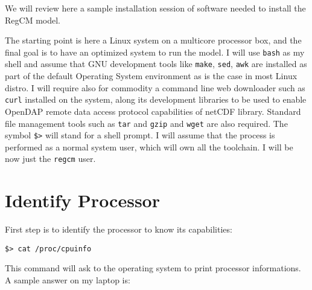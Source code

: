 
We will review here a sample installation session of software needed to
install the RegCM model.

The starting point is here a Linux system on a multicore processor box, and
the final goal is to have an optimized system to run the model.
I will use \verb=bash= as my shell and assume that GNU development tools like
\verb=make=, \verb=sed=, \verb=awk= are installed as part of the default
Operating System environment as is the case in most Linux distro.
I will require also for commodity a command line web downloader such as
\verb=curl= installed on the system, along its development libraries to be
used to enable OpenDAP remote data access protocol capabilities of netCDF
library. Standard file management tools such as \verb=tar= and \verb=gzip=
and \verb=wget= are also required.
The symbol \verb=$>= will stand for a shell prompt.
I will assume that the process is performed as a normal system user, which
will own all the toolchain. I will be now just the \verb=regcm= user.

\section{Identify Processor}

First step is to identify the processor to know its capabilities:

\begin{Verbatim}
$> cat /proc/cpuinfo
\end{Verbatim}

This command will ask to the operating system to print processor informations.
A sample answer on my laptop is:

